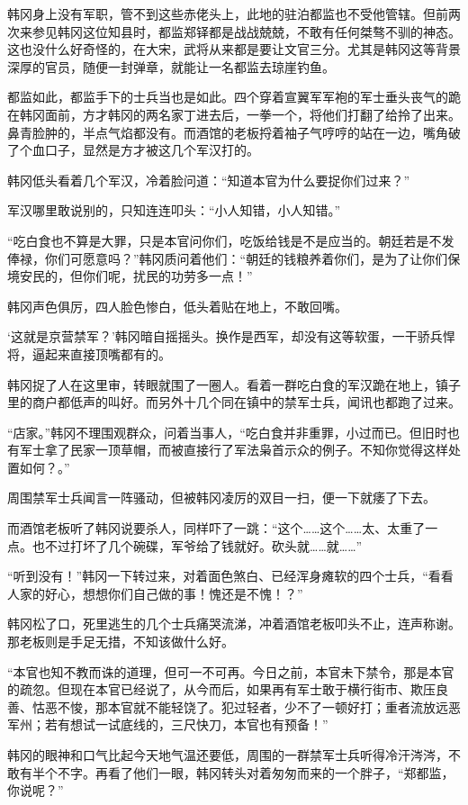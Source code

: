 韩冈身上没有军职，管不到这些赤佬头上，此地的驻泊都监也不受他管辖。但前两次来参见韩冈这位知县时，都监郑铎都是战战兢兢，不敢有任何桀骜不驯的神态。这也没什么好奇怪的，在大宋，武将从来都是要让文官三分。尤其是韩冈这等背景深厚的官员，随便一封弹章，就能让一名都监去琼崖钓鱼。

都监如此，都监手下的士兵当也是如此。四个穿着宣翼军军袍的军士垂头丧气的跪在韩冈面前，方才韩冈的两名家丁进去后，一拳一个，将他们打翻了给拎了出来。鼻青脸肿的，半点气焰都没有。而酒馆的老板捋着袖子气哼哼的站在一边，嘴角破了个血口子，显然是方才被这几个军汉打的。

韩冈低头看着几个军汉，冷着脸问道：“知道本官为什么要捉你们过来？”

军汉哪里敢说别的，只知连连叩头：“小人知错，小人知错。”

“吃白食也不算是大罪，只是本官问你们，吃饭给钱是不是应当的。朝廷若是不发俸禄，你们可愿意吗？”韩冈质问着他们：“朝廷的钱粮养着你们，是为了让你们保境安民的，但你们呢，扰民的功劳多一点！”

韩冈声色俱厉，四人脸色惨白，低头着贴在地上，不敢回嘴。

‘这就是京营禁军？’韩冈暗自摇摇头。换作是西军，却没有这等软蛋，一干骄兵悍将，逼起来直接顶嘴都有的。

韩冈捉了人在这里审，转眼就围了一圈人。看着一群吃白食的军汉跪在地上，镇子里的商户都低声的叫好。而另外十几个同在镇中的禁军士兵，闻讯也都跑了过来。

“店家。”韩冈不理围观群众，问着当事人，“吃白食并非重罪，小过而已。但旧时也有军士拿了民家一顶草帽，而被直接行了军法枭首示众的例子。不知你觉得这样处置如何？。”

周围禁军士兵闻言一阵骚动，但被韩冈凌厉的双目一扫，便一下就痿了下去。

而酒馆老板听了韩冈说要杀人，同样吓了一跳：“这个……这个……太、太重了一点。也不过打坏了几个碗碟，军爷给了钱就好。砍头就……就……”

“听到没有！”韩冈一下转过来，对着面色煞白、已经浑身瘫软的四个士兵，“看看人家的好心，想想你们自己做的事！愧还是不愧！？”

韩冈松了口，死里逃生的几个士兵痛哭流涕，冲着酒馆老板叩头不止，连声称谢。那老板则是手足无措，不知该做什么好。

“本官也知不教而诛的道理，但可一不可再。今日之前，本官未下禁令，那是本官的疏忽。但现在本官已经说了，从今而后，如果再有军士敢于横行街市、欺压良善、怙恶不悛，那本官就不能轻饶了。犯过轻者，少不了一顿好打；重者流放远恶军州；若有想试一试底线的，三尺快刀，本官也有预备！”

韩冈的眼神和口气比起今天地气温还要低，周围的一群禁军士兵听得冷汗涔涔，不敢有半个不字。再看了他们一眼，韩冈转头对着匆匆而来的一个胖子，“郑都监，你说呢？”


